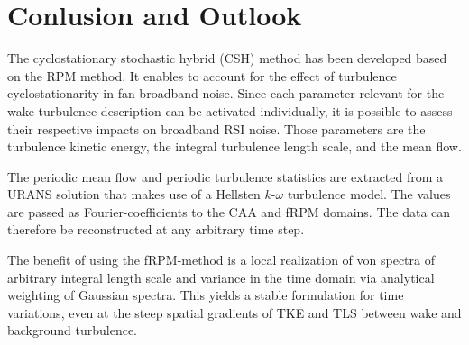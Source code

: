 \section{Conlusion and Outlook} \label{sec:conclusion}
The cyclostationary stochastic hybrid (CSH) method has been developed based on the RPM method. It enables to account for the effect of turbulence cyclostationarity in fan broadband noise. Since each parameter relevant for the wake turbulence description can be activated individually, it is possible to assess their respective impacts  on broadband RSI noise.  Those parameters are the turbulence kinetic energy, the integral turbulence length scale, and the mean flow.     

The periodic mean flow and periodic turbulence statistics are extracted from a URANS solution that makes use of a Hellsten $k$-$\omega$ turbulence model. The values are passed as Fourier-coefficients to the CAA and fRPM domains. The data can therefore be reconstructed at any arbitrary time step. 

The benefit of using the fRPM-method is a local realization of von \Karman spectra of arbitrary integral length scale and variance in the time domain via analytical weighting of Gaussian spectra. This yields a stable formulation for time variations, even at the steep spatial gradients of TKE and TLS between wake and background turbulence.


